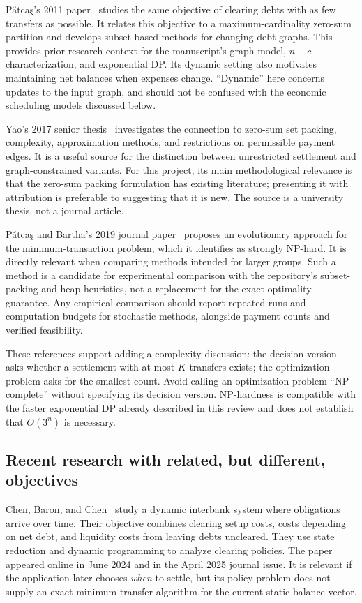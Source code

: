 \documentclass[11pt]{article}
\begin{document}
P\u{a}tca\c{s}'s 2011 paper~\cite{patcas2011} studies the same objective
of clearing debts with as few transfers as possible. It relates this
objective to a maximum-cardinality zero-sum partition and develops
subset-based methods for changing debt graphs. This provides prior
research context for the manuscript's graph model, $n-c$ characterization,
and exponential DP. Its dynamic setting also motivates maintaining net
balances when expenses change. ``Dynamic'' here concerns updates to the
input graph, and should not be confused with the economic scheduling
models discussed below.

Yao's 2017 senior thesis~\cite{yao2017} investigates the connection to
zero-sum set packing, complexity, approximation methods, and restrictions
on permissible payment edges. It is a useful source for the distinction
between unrestricted settlement and graph-constrained variants. For this
project, its main methodological relevance is that the zero-sum packing
formulation has existing literature; presenting it with attribution is
preferable to suggesting that it is new. The source is a university thesis,
not a journal article.

P\u{a}tca\c{s} and Bartha's 2019 journal paper~\cite{patcas2019}
proposes an evolutionary approach for the minimum-transaction problem,
which it identifies as strongly NP-hard. It is directly relevant when
comparing methods intended for larger groups. Such a method is a candidate
for experimental comparison with the repository's subset-packing and heap
heuristics, not a replacement for the exact optimality guarantee. Any
empirical comparison should report repeated runs and computation budgets
for stochastic methods, alongside payment counts and verified feasibility.

These references support adding a complexity discussion: the decision
version asks whether a settlement with at most $K$ transfers exists;
the optimization problem asks for the smallest count. Avoid calling an
optimization problem ``NP-complete'' without specifying its decision
version. NP-hardness is compatible with the faster exponential DP already
described in this review and does not establish that $O(3^n)$ is necessary.

\subsection{Recent research with related, but different, objectives}

Chen, Baron, and Chen~\cite{chen2025} study a dynamic interbank system
where obligations arrive over time. Their objective combines clearing
setup costs, costs depending on net debt, and liquidity costs from leaving
debts uncleared. They use state reduction and dynamic programming to
analyze clearing policies. The paper appeared online in June 2024 and in
the April 2025 journal issue. It is relevant if the application later
chooses \emph{when} to settle, but its policy problem does not supply an
exact minimum-transfer algorithm for the current static balance vector.
\end{document}
